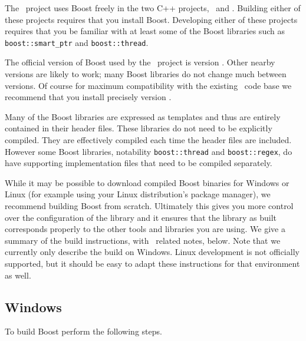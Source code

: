 The \VTank\ project uses Boost freely in the two C++ projects, \GameServer\ and \MapEditor.
Building either of these projects requires that you install Boost. Developing either of these
projects requires that you be familiar with at least some of the Boost libraries such as
\lstinline!boost::smart_ptr! and \lstinline!boost::thread!.

The official version of Boost used by the \VTank\ project is version \BoostVersion. Other nearby
versions are likely to work; many Boost libraries do not change much between versions. Of course
for maximum compatibility with the existing \VTank\ code base we recommend that you install
precisely version \BoostVersion.

Many of the Boost libraries are expressed as templates and thus are entirely contained in their
header files. These libraries do not need to be explicitly compiled. They are effectively
compiled each time the header files are included. However some Boost libraries, notability
\lstinline!boost::thread! and \lstinline!boost::regex!, do have supporting implementation files
that need to be compiled separately.

While it may be possible to download compiled Boost binaries for Windows or Linux (for example
using your Linux distribution's package manager), we recommend building Boost from scratch.
Ultimately this gives you more control over the configuration of the library and it ensures that
the library as built corresponds properly to the other tools and libraries you are using. We
give a summary of the build instructions, with \VTank\ related notes, below. Note that we
currently only describe the build on Windows. Linux development is not officially supported, but
it should be easy to adapt these instructions for that environment as well.

\subsection{Windows}

To build Boost perform the following steps.

